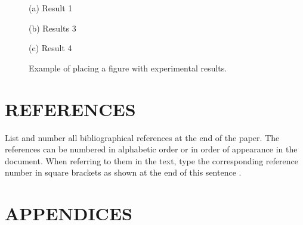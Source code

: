 \documentclass{article}
\begin{document}
\begin{figure}[htb]

\begin{minipage}[b]{1.0\linewidth}
  \centering
  \centerline{(a) Result 1}\medskip
\end{minipage}
%
\begin{minipage}[b]{.48\linewidth}
  \centering
  \centerline{(b) Results 3}\medskip
\end{minipage}
\hfill
\begin{minipage}[b]{0.48\linewidth}
  \centering
  \centerline{(c) Result 4}\medskip
\end{minipage}
%
\caption{Example of placing a figure with experimental results.}
\label{fig:res}
%
\end{figure}

\vfill
\pagebreak


\section{REFERENCES}
\label{sec:ref}

List and number all bibliographical references at the end of the paper.  The references can be numbered in alphabetic order or in order of appearance in the document.  When referring to them in the text, type the corresponding reference number in square brackets as shown at the end of this sentence \cite{C2}.




\section{APPENDICES}
\label{sec:app}
\end{document}
